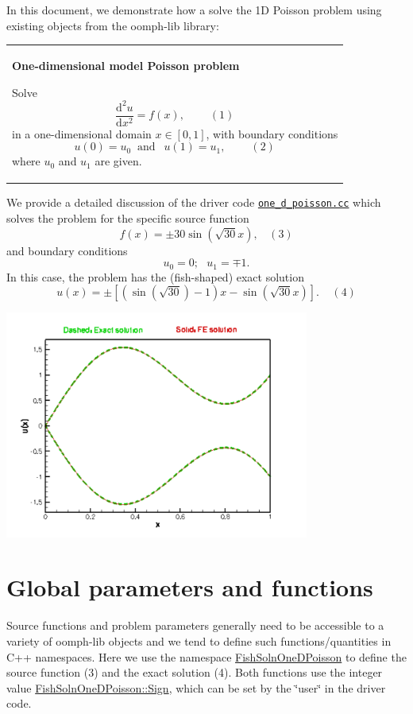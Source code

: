 In this document, we demonstrate how a solve the 1D Poisson problem using existing objects from the {\ttfamily oomph-\/lib} library\+: \begin{center} \tabulinesep=1mm
\begin{longtabu} spread 0pt [c]{*{1}{|X[-1]}|}
\hline
\begin{center} {\bfseries One-\/dimensional model Poisson problem} \end{center}  Solve \[ \frac{\mbox{d}^2u}{\mbox{d}x^2} = f(x), \ \ \ \ \ \ \ \ \ \ (1) \] in a one-\/dimensional domain $ x\in[0,1] $, with boundary conditions \[ u(0)=u_0 \ \mbox{\ \ \ and \ \ \ } \ \ u(1)=u_1, \ \ \ \ \ \ \ \ \ \ (2) \] where $ u_0 $ and $ u_1 $ are given.   \\
\end{longtabu}
\end{center} 

We provide a detailed discussion of the driver code \href{../../../../demo_drivers/poisson/one_d_poisson/one_d_poisson.cc}{\tt one\+\_\+d\+\_\+poisson.\+cc} which solves the problem for the specific source function \[ f(x) = \pm 30 \sin(\sqrt{30} x), \ \ \ \ (3) \] and boundary conditions \[ u_0= 0; \ \ \ u_1 = \mp 1. \] In this case, the problem has the (fish-\/shaped) exact solution \[ u(x) = \pm \left[ \left(\sin(\sqrt{30})-1\right) x - \sin(\sqrt{30} x)\right]. \ \ \ \ \ (4)\]

 
\begin{DoxyImage}
\includegraphics[width=0.75\textwidth]{one_d_fish}
\end{DoxyImage}




 

\hypertarget{index_global}{}\section{Global parameters and functions}\label{index_global}
Source functions and problem parameters generally need to be accessible to a variety of {\ttfamily oomph-\/lib} objects and we tend to define such functions/quantities in C++ namespaces. Here we use the namespace {\ttfamily \hyperlink{namespaceFishSolnOneDPoisson}{Fish\+Soln\+One\+D\+Poisson}} to define the source function (3) and the exact solution (4). Both functions use the integer value \hyperlink{namespaceFishSolnOneDPoisson_a108e814ef887ffcc8caa7c65a7d30f06}{Fish\+Soln\+One\+D\+Poisson\+::\+Sign}, which can be set by the \char`\"{}user\char`\"{} in the driver code.

